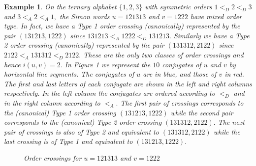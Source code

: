 \documentclass[12pt,a4paper]{amsart}
\newtheorem{example}{Example}
\begin{document}
\begin{example}\label{Simon}\rm On the ternary alphabet $\{1,2,3\}$ with symmetric orders  $1<_D 2<_D 3$ and $3<_A 2<_A 1,$ the {\it Simon words} $u=121313$ and $v=1222$ have mixed order type. In fact, we have a Type 1 order crossing (canonically) represented by the pair $(131213, 1222)$ since  $131213<_A 1222<_ D 131213.$  Similarly we have a Type 2 order crossing (canonically) represented by the pair $(131312, 2122)$ since $2122<_A 131312<_D 2122.$ These are the only two classes of order crossings and hence $i(u,v)=2.$
In Figure 1 we represent the $10$ conjugates of $u$ and $v$ by horizontal line segments. The conjugates of $u$ are in blue, and those of $v$ in red. The first and last letters of each conjugate are shown in the left and right columns respectively.  In the left column the conjugates are ordered according to $<_D$ and in the right column according to $<_A.$ The first pair of crossings corresponds to the (canonical) Type 1 order crossing $(131213, 1222)$ while the second pair  corresponds to the (canonical) Type 2 order crossing $(131312, 2122).$ The next pair of crossings is also of Type 2 and equivalent to $(131312, 2122)$ while the last crossing is of Type 1 and equivalent to $(131213, 1222).$ 


\begin{figure}\label{SimonFig}

\caption{Order crossings for $u=121313$ and $v=1222$}
\end{figure}




\end{example} 
\end{document}
